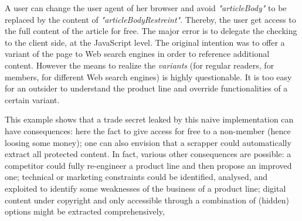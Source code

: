 A user can change the user agent of her browser and avoid \emph{"articleBody"} to be replaced by the content of \emph{"articleBodyRestreint"}. Thereby, the user get access to the full content of the article for free.
The major error is to delegate the checking to the client side, at the JavaScript level. The original intention was to offer a variant of the page to Web search engines in order to reference additional content. However the means to realize the \emph{variants} (for regular readers, for members, for different Web search engines) is highly questionable. It is too easy for an outsider to understand the product line and override functionalities of a certain variant.

This example shows that a trade secret leaked by this naive implementation can have consequences: here the fact to give access for free to a non-member (hence loosing some money); one can also envision that a scrapper could automatically extract all protected content. 
 In fact, various other consequences are possible: a competitor could fully re-engineer a product line and then propose an improved one; technical or marketing constraints could be identified, analysed, and exploited to identify some weaknesses of the business of a product line; digital content under copyright and only accessible through a combination of (hidden) options might be extracted comprehensively, \etc
 
